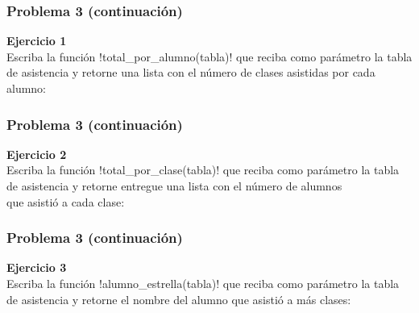 \documentclass[12pt]{beamer}
\begin{document}
  \begin{frame}
    \frametitle{Problema 3 (continuación)}
    \label{problema-asistencia-2}
    \textbf{Ejercicio 1} \\
    Escriba la función \li!total_por_alumno(tabla)!
    que reciba como parámetro la tabla de asistencia
    y retorne una lista con el número de clases
    asistidas por cada alumno:
    
  \end{frame}

  \begin{frame}
    \frametitle{Problema 3 (continuación)}
    \label{problema-asistencia-3}
    \textbf{Ejercicio 2} \\
    Escriba la función \li!total_por_clase(tabla)!
    que reciba como parámetro la tabla de asistencia
    y retorne entregue una lista con el número de alumnos \\
    que asistió a cada clase:
    
  \end{frame}

  \begin{frame}
    \frametitle{Problema 3 (continuación)}
    \label{problema-asistencia-4}
    \textbf{Ejercicio 3} \\
    Escriba la función \li!alumno_estrella(tabla)!
    que reciba como parámetro la tabla de asistencia
    y retorne el nombre del alumno que asistió a más clases:
    
  \end{frame}
\end{document}
